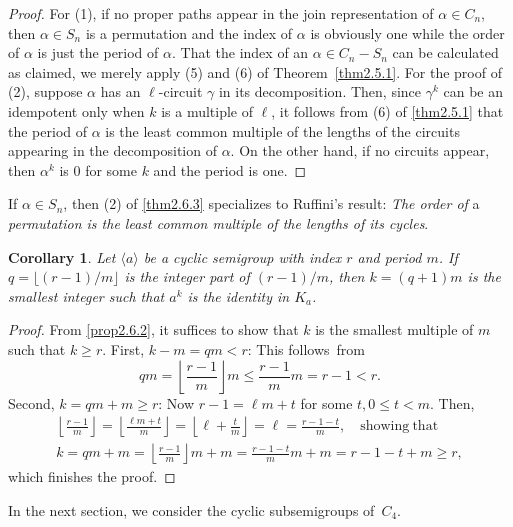 \documentclass{surv-l}
\numberwithin{equation}{section}
\numberwithin{table}{section}
\numberwithin{figure}{section}
\theoremstyle{plain}
\newtheorem{corollary}[equation]{Corollary}
\theoremstyle{definition}
\begin{document}
\begin{proof} For (1), if no proper paths appear in the join
representation of $\alpha\in C_{n}$, then $\alpha\in S_{n}$ is a
permutation and the index of $\alpha$ is obviously one while the
order of $\alpha$ is just the period of $\alpha$. That the index
of an $\alpha\in C_{n}-S_{n}$ can be calculated as claimed, we
merely apply (5) and (6) of Theorem~\ref{thm2.5.1}. For the proof
of (2), suppose $\alpha$ has an $\ell$-circuit $\gamma$ in its
decomposition. Then, since $\gamma^{k}$ can be an idempotent only
when $k$ is a multiple of $\ell$, it follows from (6) of
\ref{thm2.5.1} that the period of $\alpha$ is the least common
multiple of the lengths of the circuits appearing in the
decomposition of $\alpha$. On the other hand, if no circuits
appear, then $\alpha^{k}$ is $0$ for some $k$ and the period is one.
\end{proof}

If $\alpha\in S_{n}$, then (2) of \ref{thm2.6.3} specializes to
Ruffini's result: \emph{The order of} a
\emph{permutation is the least common multiple of the lengths of
its cycles}.

\begin{corollary}\label{cor2.6.4}
Let $\langle a\rangle$ be a cyclic semigroup with index $r$ and
period $m$. If $q=\lfloor(r-1)/m\rfloor$ is the integer part of
$(r-1)/m$, then $k= (q+1)m$ is the smallest integer such that
$a^{k}$ is the identity in $K_{a}$.
\end{corollary}

\begin{proof}
From \ref{prop2.6.2}, it suffices to show that $k$ is the smallest
multiple of $m$ such that $k\geq r$. First, $k-m =qm<r$: This
follows~from
\[
qm=\left\lfloor\frac{r-1}{m}\right\rfloor m\leq\frac{r-1}{m}m=r-1<r.
\]
Second, $k=qm+m\geq r$: Now $r-1 =\ell m+t$ for some $t,0\leq
t<m$. Then,
\begin{gather*}
\textstyle\left\lfloor\frac{r-1}{m}\right\rfloor=\left\lfloor\frac{\ell
m+t}{m}\right\rfloor=\left\lfloor
\ell+\frac{t}{m}\right\rfloor=\ell=\frac{r-1-t}{m},\quad
\mathrm{showing\ that}\\
\textstyle k=qm+m=\left\lfloor\frac{r-1}{m}\right\rfloor
m+m=\frac{r-1-t}{m}m+m=r-1-t+m\geq r,
\end{gather*}
which finishes the proof.
\end{proof}

In the next section, we consider the cyclic subsemigroups
of~$C_{4}$.
\end{document}
